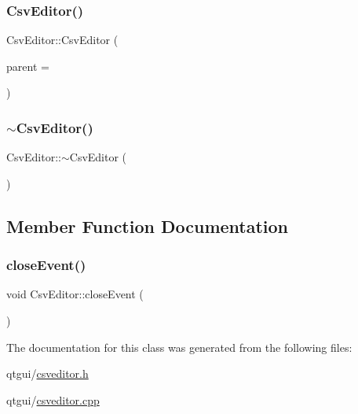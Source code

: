 \subsubsection{\texorpdfstring{CsvEditor()}{CsvEditor()}}
{\footnotesize\ttfamily Csv\+Editor\+::\+Csv\+Editor (\begin{DoxyParamCaption}\item[{Q\+Widget $\ast$}]{parent = {} }\end{DoxyParamCaption})\hspace{0.3cm}{\ttfamily [explicit]}}

\mbox{\label{class_csv_editor_abeb132e295a0408b44cbf3438ea0a5e3}} 
\subsubsection{\texorpdfstring{$\sim$CsvEditor()}{~CsvEditor()}}
{\footnotesize\ttfamily Csv\+Editor\+::$\sim$\+Csv\+Editor (\begin{DoxyParamCaption}{ }\end{DoxyParamCaption})}



\subsection{Member Function Documentation}
\mbox{\label{class_csv_editor_a6593a23cad0852bc3a60eb3bd44febc8}} 
\subsubsection{\texorpdfstring{closeEvent()}{closeEvent()}}
{\footnotesize\ttfamily void Csv\+Editor\+::close\+Event (\begin{DoxyParamCaption}\item[{Q\+Close\+Event $\ast$}]{ }\end{DoxyParamCaption})\hspace{0.3cm}{\ttfamily [protected]}}



The documentation for this class was generated from the following files\+:\begin{DoxyCompactItemize}
\item 
qtgui/\mbox{\hyperlink{csveditor_8h}{csveditor.\+h}}\item 
qtgui/\mbox{\hyperlink{csveditor_8cpp}{csveditor.\+cpp}}\end{DoxyCompactItemize}
